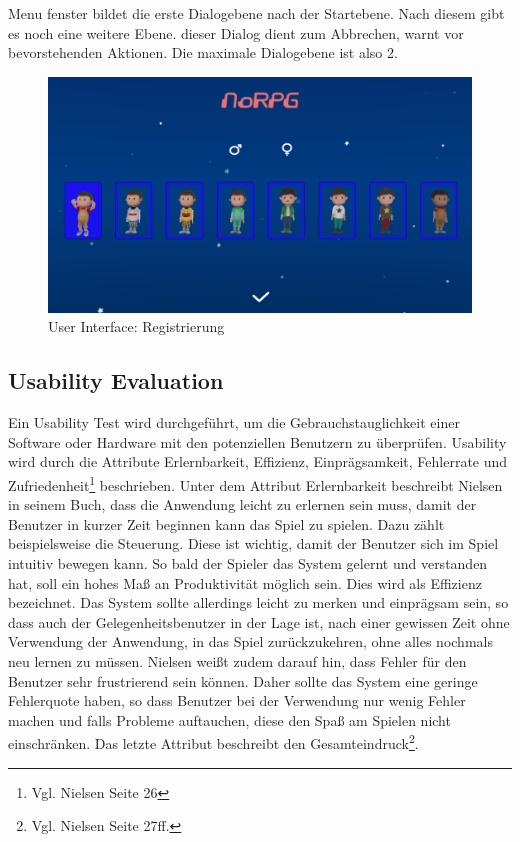 		Menu fenster bildet die erste Dialogebene nach der Startebene. Nach diesem gibt es noch eine weitere Ebene. dieser Dialog dient zum Abbrechen, warnt vor bevorstehenden Aktionen. Die maximale Dialogebene ist also 2. 

		\begin{figure}[htbp]
			\centering 
			\label{RegisterUI}
			\includegraphics[width=13cm]{pics/RegisterUI.png}
			\caption{User Interface: Registrierung}
		\end{figure}

	
	\subsection{Usability Evaluation}
		Ein Usability Test wird durchgeführt, um die Gebrauchstauglichkeit einer Software oder Hardware mit den potenziellen Benutzern zu überprüfen. Usability wird durch die Attribute Erlernbarkeit, Effizienz, Einprägsamkeit, Fehlerrate und Zufriedenheit\footnote{Vgl. Nielsen \cite{NielsenUI} Seite 26} beschrieben. Unter dem Attribut Erlernbarkeit beschreibt Nielsen in seinem Buch, dass die Anwendung leicht zu erlernen sein muss, damit der Benutzer in kurzer Zeit beginnen kann das Spiel zu spielen. Dazu zählt beispielsweise die Steuerung. Diese ist wichtig, damit der Benutzer sich im Spiel intuitiv bewegen kann. So bald der Spieler das System gelernt und verstanden hat, soll ein hohes Maß an Produktivität möglich sein. Dies wird als Effizienz bezeichnet. Das System sollte allerdings leicht zu merken und einprägsam sein, so dass auch der Gelegenheitsbenutzer in der Lage ist, nach einer gewissen Zeit ohne Verwendung der Anwendung, in das Spiel zurückzukehren, ohne alles nochmals neu lernen zu müssen. Nielsen weißt zudem darauf hin, dass Fehler für den Benutzer sehr frustrierend sein können. Daher sollte das System eine geringe Fehlerquote haben, so dass Benutzer bei der Verwendung nur wenig Fehler machen und falls Probleme auftauchen, diese den Spaß am Spielen nicht einschränken. Das letzte Attribut beschreibt den Gesamteindruck\footnote{Vgl. Nielsen \cite{NielsenUI} Seite 27ff.}.
		
